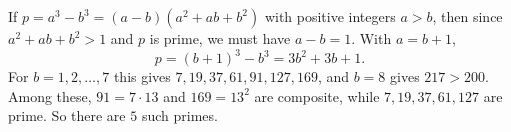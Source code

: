 If $p=a^3-b^3=(a-b)(a^2+ab+b^2)$ with positive integers $a>b$, then since $a^2+ab+b^2>1$ and $p$ is prime, we must have $a-b=1$. With $a=b+1$,
\[
p=(b+1)^3-b^3=3b^2+3b+1 .
\]
For $b=1,2,\dots,7$ this gives $7,19,37,61,91,127,169$, and $b=8$ gives $217>200$. Among these, $91=7\cdot13$ and $169=13^2$ are composite, while $7,19,37,61,127$ are prime. So there are $\boxed{5}$ such primes.
